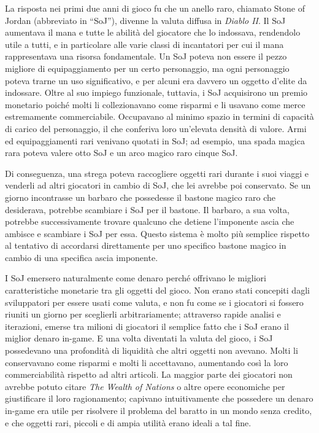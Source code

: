 \documentclass[
  a5paper,
  smalldemyvopaper,10pt,twoside,onecolumn,openright,extrafontsizes,hidelinks]{memoir}
\begin{document}
La risposta nei primi due anni di gioco fu che un anello raro, chiamato
Stone of Jordan (abbreviato in ``SoJ''), divenne la valuta diffusa in
\emph{Diablo II}. Il SoJ aumentava il mana e tutte le abilità del
giocatore che lo indossava, rendendolo utile a tutti, e in particolare
alle varie classi di incantatori per cui il mana rappresentava una
risorsa fondamentale. Un SoJ poteva non essere il pezzo migliore di
equipaggiamento per un certo personaggio, ma ogni personaggio poteva
trarne un uso significativo, e per alcuni era davvero un oggetto d'elite
da indossare. Oltre al suo impiego funzionale, tuttavia, i SoJ
acquisirono un premio monetario poiché molti li collezionavano come
risparmi e li usavano come merce estremamente commerciabile. Occupavano
al minimo spazio in termini di capacità di carico del personaggio, il
che conferiva loro un'elevata densità di valore. Armi ed equipaggiamenti
rari venivano quotati in SoJ; ad esempio, una spada magica rara poteva
valere otto SoJ e un arco magico raro cinque SoJ.

Di conseguenza, una strega poteva raccogliere oggetti rari durante i
suoi viaggi e venderli ad altri giocatori in cambio di SoJ, che lei
avrebbe poi conservato. Se un giorno incontrasse un barbaro che
possedesse il bastone magico raro che desiderava, potrebbe scambiare i
SoJ per il bastone. Il barbaro, a sua volta, potrebbe successivamente
trovare qualcuno che detiene l'imponente ascia che ambisce e scambiare i
SoJ per essa. Questo sistema è molto più semplice rispetto al tentativo
di accordarsi direttamente per uno specifico bastone magico in cambio di
una specifica ascia imponente.

I SoJ emersero naturalmente come denaro perché offrivano le migliori
caratteristiche monetarie tra gli oggetti del gioco. Non erano stati
concepiti dagli sviluppatori per essere usati come valuta, e non fu come
se i giocatori si fossero riuniti un giorno per sceglierli
arbitrariamente; attraverso rapide analisi e iterazioni, emerse tra
milioni di giocatori il semplice fatto che i SoJ erano il miglior denaro
in-game. E una volta diventati la valuta del gioco, i SoJ possedevano
una profondità di liquidità che altri oggetti non avevano. Molti li
conservavano come risparmi e molti li accettavano, aumentando così la
loro commerciabilità rispetto ad altri articoli. La maggior parte dei
giocatori non avrebbe potuto citare \emph{The Wealth of Nations} o altre
opere economiche per giustificare il loro ragionamento; capivano
intuitivamente che possedere un denaro in-game era utile per risolvere
il problema del baratto in un mondo senza credito, e che oggetti rari,
piccoli e di ampia utilità erano ideali a tal fine.
\end{document}
